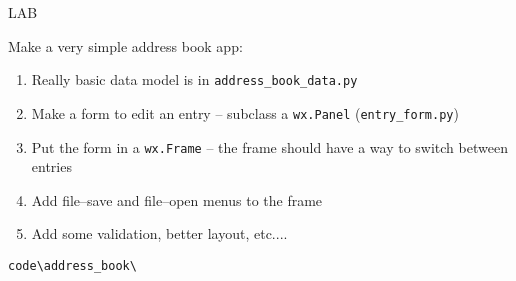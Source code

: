 \documentclass{beamer}
\begin{document}
\begin{frame}[fragile]{LAB}

\vfill
{\Large Make a very simple address book app:}

\begin{enumerate}
 \item Really basic data model is in \verb`address_book_data.py`
 \item Make a form to edit an entry -- subclass a \verb`wx.Panel` (\verb`entry_form.py`)
 \item Put the form in a \verb`wx.Frame` -- the frame should have a way to switch between entries
 \item Add file--save and file--open menus to the frame
 \item Add some validation, better layout, etc....
\end{enumerate}

\vfill
\verb`code\address_book\`

\end{frame}
\end{document}

